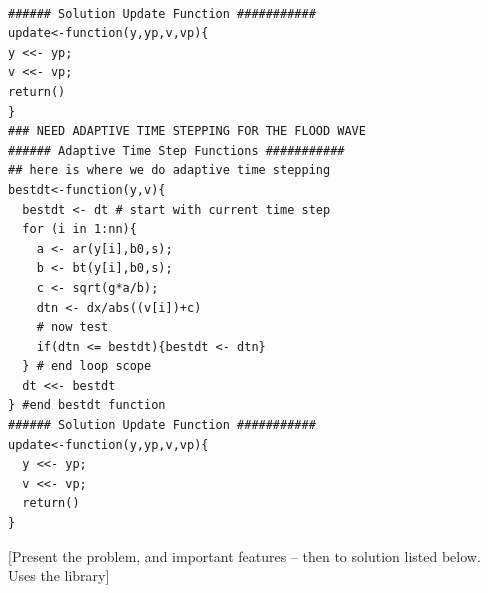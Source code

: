 \begin{lstlisting}[caption=R code demonstrating prototype updating function, label=lst:update-functions]

###### Solution Update Function ###########
update<-function(y,yp,v,vp){
y <<- yp;
v <<- vp;
return()
}
### NEED ADAPTIVE TIME STEPPING FOR THE FLOOD WAVE 
###### Adaptive Time Step Functions ###########
## here is where we do adaptive time stepping
bestdt<-function(y,v){
  bestdt <- dt # start with current time step
  for (i in 1:nn){
    a <- ar(y[i],b0,s);
    b <- bt(y[i],b0,s);
    c <- sqrt(g*a/b);
    dtn <- dx/abs((v[i])+c)
    # now test
    if(dtn <= bestdt){bestdt <- dtn}
  } # end loop scope
  dt <<- bestdt
} #end bestdt function
###### Solution Update Function ###########
update<-function(y,yp,v,vp){
  y <<- yp;
  v <<- vp;
  return()
}
\end{lstlisting}

[Present the problem, and important features -- then to solution listed below.  Uses the library]

